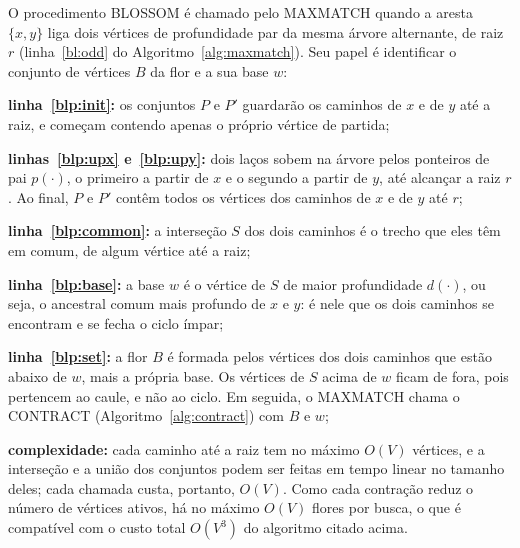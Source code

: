 \begin{algorithm}[H]
    \DontPrintSemicolon
    \SetAlgoLined

    \caption{Algoritmo de BLOSSOM \cite{jungnickel}}
    \label{alg:blossom_proc}
\end{algorithm}

O procedimento BLOSSOM é chamado pelo MAXMATCH quando a aresta $\{x, y\}$ liga dois vértices de profundidade par da mesma árvore alternante, de raiz $r$ (linha~\ref{bl:odd} do Algoritmo~\ref{alg:maxmatch}). Seu papel é identificar o conjunto de vértices $B$ da flor e a sua base $w$:

\begin{alineas}
    \item \textbf{linha~\ref{blp:init}:} os conjuntos $P$ e $P'$ guardarão os caminhos de $x$ e de $y$ até a raiz, e começam contendo apenas o próprio vértice de partida;
    \item \textbf{linhas~\ref{blp:upx} e~\ref{blp:upy}:} dois laços sobem na árvore pelos ponteiros de pai $p(\cdot)$, o primeiro a partir de $x$ e o segundo a partir de $y$, até alcançar a raiz $r$. Ao final, $P$ e $P'$ contêm todos os vértices dos caminhos de $x$ e de $y$ até $r$;
    \item \textbf{linha~\ref{blp:common}:} a interseção $S$ dos dois caminhos é o trecho que eles têm em comum, de algum vértice até a raiz;
    \item \textbf{linha~\ref{blp:base}:} a base $w$ é o vértice de $S$ de maior profundidade $d(\cdot)$, ou seja, o ancestral comum mais profundo de $x$ e $y$: é nele que os dois caminhos se encontram e se fecha o ciclo ímpar;
    \item \textbf{linha~\ref{blp:set}:} a flor $B$ é formada pelos vértices dos dois caminhos que estão abaixo de $w$, mais a própria base. Os vértices de $S$ acima de $w$ ficam de fora, pois pertencem ao caule, e não ao ciclo. Em seguida, o MAXMATCH chama o CONTRACT (Algoritmo~\ref{alg:contract}) com $B$ e $w$;
    \item \textbf{complexidade:} cada caminho até a raiz tem no máximo $O(V)$ vértices, e a interseção e a união dos conjuntos podem ser feitas em tempo linear no tamanho deles; cada chamada custa, portanto, $O(V)$. Como cada contração reduz o número de vértices ativos, há no máximo $O(V)$ flores por busca, o que é compatível com o custo total $O(V^3)$ do algoritmo citado acima.
\end{alineas}


